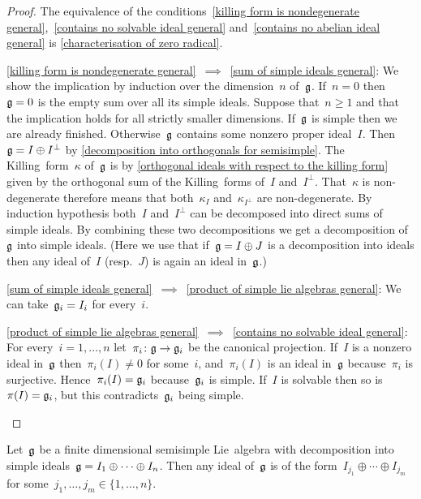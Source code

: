 \begin{proof}
  The equivalence of the conditions~\ref*{killing form is nondegenerate general},~\ref*{contains no solvable ideal general} and~\ref*{contains no abelian ideal general} is \cref{characterisation of zero radical}.
  \begin{implicationlist}
    \item[\ref*{killing form is nondegenerate general}~$\implies$~\ref*{sum of simple ideals general}:]
      We show the implication by induction over the dimension~$n$ of~$\mathfrak{g}$.
      If~$n = 0$ then~$\mathfrak{g} = 0$ is the empty sum over all its simple ideals.
      Suppose that~$n \geq 1$ and that the implication holds for all strictly smaller dimensions.
      If~$\mathfrak{g}$ is simple then we are already finished.
      Otherwise~$\mathfrak{g}$ contains some nonzero proper ideal~$I$.
      Then~$\mathfrak{g} = I \oplus I^\perp$ by \cref{decomposition into orthogonals for semisimple}.
      The Killing~form~$\kappa$ of~$\mathfrak{g}$ is by \cref{orthogonal ideals with respect to the killing form} given by the orthogonal sum of the Killing~forms of~$I$ and~$I^\perp$.
      That~$\kappa$ is non-degenerate therefore means that both~$\kappa_{I}$ and~$\kappa_{I^\perp}$ are non-degenerate. 
      By induction hypothesis both~$I$ and~$I^\perp$ can be decomposed into direct sums of simple ideals.
      By combining these two decompositions we get a decomposition of~$\mathfrak{g}$ into simple ideals.
      (Here we use that if~$\mathfrak{g} = I \oplus J$ is a decomposition into ideals then any ideal of~$I$ (resp.~$J$) is again an ideal in~$\mathfrak{g}$.)
    \item[\ref*{sum of simple ideals general}~$\implies$~\ref*{product of simple lie algebras general}:]
      We can take~$\mathfrak{g}_i = I_i$ for every~$i$.
    \item[\ref*{product of simple lie algebras general}~$\implies$~\ref*{contains no solvable ideal general}:]
      For every~$i = 1, \dotsc, n$ let~$\pi_i \colon \mathfrak{g} \to \mathfrak{g}_i$ be the canonical projection.
      If~$I$ is a nonzero ideal in~$\mathfrak{g}$ then~$\pi_i(I) \neq 0$ for some~$i$, and~$\pi_i(I)$ is an ideal in~$\mathfrak{g}$ because~$\pi_i$ is surjective.
      Hence~$\pi_i(I) = \mathfrak{g}_i$ because~$\mathfrak{g}_i$ is simple.
      If~$I$ is solvable then so is~$\pi(I) = \mathfrak{g}_i$, but this contradicts~$\mathfrak{g}_i$ being simple.
    \qedhere
  \end{implicationlist}
\end{proof}


\begin{corollary}
  \label{ideals are again sum of simples}
  Let~$\mathfrak{g}$ be a finite dimensional semisimple Lie~algebra with decomposition into simple ideals~$\mathfrak{g} = I_1 \oplus \dotsb \oplus I_n$.
  Then any ideal of~$\mathfrak{g}$ is of the form~$I_{j_1} \oplus \dotsb \oplus I_{j_m}$ for some~$j_1, \dotsc, j_m \in \{1, \dotsc, n\}$.
\end{corollary}


